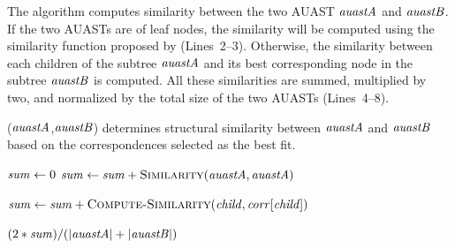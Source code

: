 

The  algorithm computes similarity between the two AUAST $\mathit{auastA}$ and $\mathit{auastB}$. If the two AUASTs are of leaf nodes, the similarity will be computed using the similarity function proposed by \citet{2008:fse:cottrell} (Lines~2--3). Otherwise, the similarity between each children of the subtree $\mathit{auastA}$ and its best corresponding node in the subtree $\mathit{auastB}$ is computed. All these similarities are summed, multiplied by two, and normalized by the total size of the two AUASTs (Lines~4--8).





\begin{algorithm}
 \caption{($\mathit{auastA}$,$\mathit{auastB}$) determines structural similarity between $\mathit{auastA}$ and $\mathit{auastB}$ based on the correspondences selected as the best fit.}
  \label{simi}
  \begin{algorithmic}[1]
  \ComputeSimilarityy
  \State $\mathit{sum} \gets 0$
  \State $\mathit{sum} \gets  \mathit{sum} + \textsc{Similarity}(\mathit{auastA},\mathit{auastA})$
 		
 		\State $\mathit{sum} \gets \mathit{sum}+\textsc{Compute-Similarity}(\mathit{child},\mathit{corr}[\mathit{child}])$		 
 \EndFor

 \EndIf
 \Return $(2*\mathit{sum}) / ({|\mathit{auastA}| + |\mathit{auastB}|})$

\end{algorithmic}
\end{algorithm}




